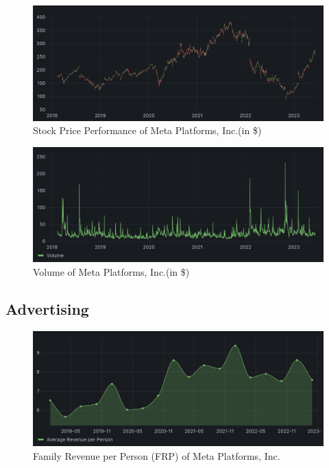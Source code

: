 \documentclass[12pt, a4paper]{article}
\begin{document}

\begin{figure}[H]
    \centering
    \includegraphics[width=1.00\textwidth]{stock-price}
    \caption{Stock Price Performance of Meta Platforms, Inc.(in
    \$)\cite{stockPrice}}
    \label{fig:stock-price}
\end{figure}

\begin{figure}[H]
    \centering
    \includegraphics[width=1.00\textwidth]{volume}
    \caption{Volume of Meta Platforms, Inc.(in \$)\cite{stockPrice}}
    \label{fig:volume}
\end{figure}

\subsection*{Advertising}

\begin{figure}[H]
    \centering
    \includegraphics[width=1.00\textwidth]{family-revenue-per-person}
    \caption{Family Revenue per Person (FRP) of Meta Platforms,
    Inc.\cite{2023q1,2021q2Slides,2019q4Slides}}
    \label{fig:family-revenue-per-person}
\end{figure}
\end{document}
